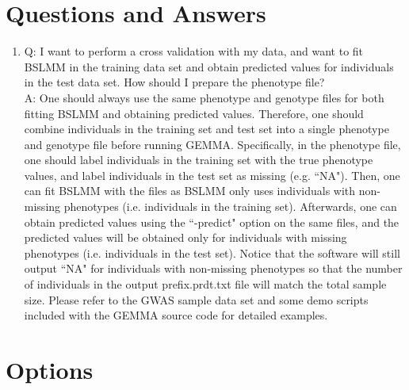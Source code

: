 \documentclass[11pt]{article}
\begin{document}
\section{Questions and Answers}
\begin{enumerate}
\item Q: I want to perform a cross validation with my data, and want to fit BSLMM in the training data set and obtain predicted values for individuals in the test data set. How should I prepare the phenotype file?\\
A: One should always use the same phenotype and genotype files for both fitting BSLMM and obtaining predicted values. Therefore, one should combine individuals in the training set and test set into a single phenotype and genotype file before running GEMMA. Specifically, in the phenotype file, one should label individuals in the training set with the true phenotype values, and label individuals in the test set as missing (e.g. ``NA"). Then, one can fit BSLMM with the files as BSLMM only uses individuals with non-missing phenotypes (i.e. individuals in the training set). Afterwards, one can obtain predicted values using the ``-predict" option on the same files, and the predicted values will be obtained only for individuals with missing phenotypes (i.e. individuals in the test set). Notice that the software will still output ``NA" for individuals with non-missing phenotypes so that the number of individuals in the output prefix.prdt.txt file will match the total sample size. Please refer to the GWAS sample data set and some demo scripts included with the GEMMA source code for detailed examples.
\end{enumerate}

\clearpage
\newpage
\section{Options}
\end{document}
